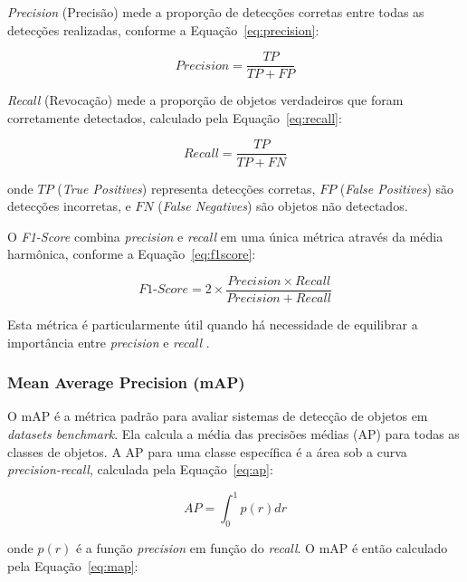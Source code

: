 \textit{Precision} (Precisão) mede a proporção de detecções corretas entre todas as detecções realizadas, conforme a Equação~\ref{eq:precision}:

\begin{equation}
\label{eq:precision}
Precision = \frac{TP}{TP + FP}
\end{equation}

\textit{Recall} (Revocação) mede a proporção de objetos verdadeiros que foram corretamente detectados, calculado pela Equação~\ref{eq:recall}:

\begin{equation}
\label{eq:recall}
Recall = \frac{TP}{TP + FN}
\end{equation}

\noindent onde $TP$ (\textit{True Positives}) representa detecções corretas, $FP$ (\textit{False Positives}) são detecções incorretas, e $FN$ (\textit{False Negatives}) são objetos não detectados.

O \textit{F1-Score} combina \textit{precision} e \textit{recall} em uma única métrica através da média harmônica, conforme a Equação~\ref{eq:f1score}:

\begin{equation}
\label{eq:f1score}
F1\text{-}Score = 2 \times \frac{Precision \times Recall}{Precision + Recall}
\end{equation}

Esta métrica é particularmente útil quando há necessidade de equilibrar a importância entre \textit{precision} e \textit{recall} \cite{powers2011evaluation}.

\subsubsection{Mean Average Precision (mAP)}

O mAP é a métrica padrão para avaliar sistemas de detecção de objetos em \textit{datasets benchmark}. Ela calcula a média das precisões médias (AP) para todas as classes de objetos. A AP para uma classe específica é a área sob a curva \textit{precision-recall}, calculada pela Equação~\ref{eq:ap}:

\begin{equation}
\label{eq:ap}
AP = \int_{0}^{1} p(r)dr
\end{equation}

\noindent onde $p(r)$ é a função \textit{precision} em função do \textit{recall}. O mAP é então calculado pela Equação~\ref{eq:map}:

